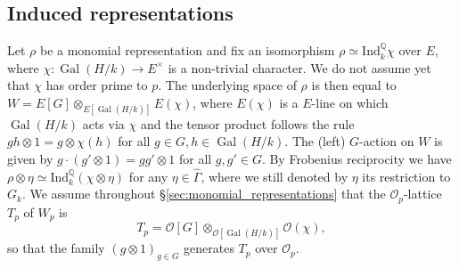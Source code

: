 \documentclass[12pt]{amsart}
\newcommand\bQ{\mathbb{Q}}
\newcommand\cO{\mathcal{O}}
\newcommand{\Ind}{\mathrm{Ind}}
\DeclareMathOperator{\Gal}{Gal}
\theoremstyle{defstyle}
\theoremstyle{thmstyle}
\begin{document}
\subsection{Induced representations}
Let $\rho$ be a monomial representation and fix an isomorphism $\rho \simeq \Ind_k^{\bQ}\chi$ over $E$, where $\chi : \Gal(H/k) \longrightarrow E^\times$ is a non-trivial character. We do not assume yet that $\chi$ has order prime to $p$. The underlying space of $\rho$ is then equal to $W=E[G] \otimes_{E[\Gal(H/k)]} E(\chi)$, where $E(\chi)$ is a $E$-line on which $\Gal(H/k)$ acts via $\chi$ and  the tensor product follows the rule $gh\otimes 1=g\otimes\chi(h)$ for all $g\in G,h\in\Gal(H/k)$. The (left) $G$-action on $W$ is given by $g\cdot(g'\otimes 1)=gg'\otimes 1$ for all $g,g'\in G$. By Frobenius reciprocity we have $\rho \otimes \eta \simeq \Ind_k^{\bQ}(\chi \otimes \eta)$ for any $\eta\in \widehat{\Gamma}$, where we still denoted by $\eta$ its restriction to $G_k$. We assume throughout \S\ref{sec:monomial_representations} that the $\cO_p$-lattice $T_p$ of $W_{p}$ is 
$$T_p=\cO[G]\otimes_{\cO[\Gal(H/k)]}\cO(\chi),$$ 
so that the family $(g\otimes 1)_{g\in G}$ generates $T_p$ over $\cO_p$.
\end{document}
